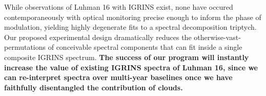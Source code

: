 \documentclass[11pt]{article}
\begin{document}
{\bandthreeplan




\classicalbackup




\justifyduplications

While observations of Luhman 16 with IGRINS exist, none have occured contemporaneously with optical monitoring precise enough to inform the phase of modulation, yielding highly degenerate fits to a spectral decomposition triptych.  Our proposed experimental design dramatically reduces the otherwise-vast-permutations of conceivable spectral components that can fit inside a single composite IGRINS spectrum.  \textbf{The success of our program will instantly increase the value of existing IGRINS spectra of Luhman 16, since we can re-interpret spectra over multi-year baselines once we have faithfully disentangled the contribution of clouds.}


%

%
% 
%

}
\end{document}
